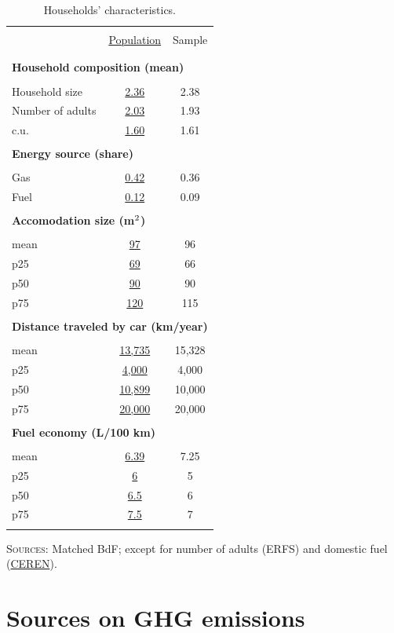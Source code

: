 \documentclass[english,5p,authoryear]{elsarticle}
\begin{document}
\begin{appendices}
\begin{table}[!htbp]
    \caption{Households' characteristics.\label{tab:app-energetic-characs}}
\centering
\begin{tabular}{lcc}
\hline \hline  \\[-1.8ex]
 & \uline{Population} & Sample  \tabularnewline \\[-1.8ex]
\hline  \\[-1.8ex]
\multicolumn{3}{l}{\textbf{Household composition (mean)}} \tabularnewline  \\[-1.8ex]
Household size & \uline{2.36} & 2.38\tabularnewline
Number of adults & \uline{2.03} & 1.93\tabularnewline
c.u. & \uline{1.60} & 1.61\tabularnewline
\hline   \\[-1.8ex]
\multicolumn{3}{l}{\textbf{Energy source (share)}} \tabularnewline  \\[-1.8ex]
Gas & \uline{0.42} & 0.36\tabularnewline
Fuel & \uline{0.12} & 0.09\tabularnewline
\hline   \\[-1.8ex]
\multicolumn{3}{l}{\textbf{Accomodation size (m$^\textnormal{2}$)}} \tabularnewline  \\[-1.8ex]
mean & \uline{97} & 96\tabularnewline
p25 & \uline{69} & 66\tabularnewline
p50 & \uline{90} & 90\tabularnewline
p75 & \uline{120} & 115\tabularnewline
\hline   \\[-1.8ex]
\multicolumn{3}{l}{\textbf{Distance traveled by car (km/year)}} \tabularnewline  \\[-1.8ex]
mean & \uline{13,735} & 15,328\tabularnewline
p25 & \uline{4,000} & 4,000\tabularnewline
p50 & \uline{10,899} & 10,000 \tabularnewline
p75 & \uline{20,000 } & 20,000 \tabularnewline
\hline   \\[-1.8ex]
\multicolumn{3}{l}{\textbf{Fuel economy (L/100 km)}} \tabularnewline  \\[-1.8ex]
mean & \uline{6.39} & 7.25\tabularnewline
p25 & \uline{6} & 5\tabularnewline
p50 & \uline{6.5} & 6\tabularnewline
p75 & \uline{7.5} & 7\tabularnewline  \\[-1.8ex]
\hline \hline 
\end{tabular}\bigskip{}

%
     \footnotesize{\textsc{Sources:} Matched BdF; except for number of adults (ERFS) and domestic fuel (\href{https://www.lesechos.fr/industrie-services/energie-environnement/le-chauffage-au-fioul-devient-de-plus-en-plus-cher-147372}{CEREN}).}
\end{table}

\section{Sources on GHG emissions\label{app:sources}}


\end{appendices}
\end{document}
